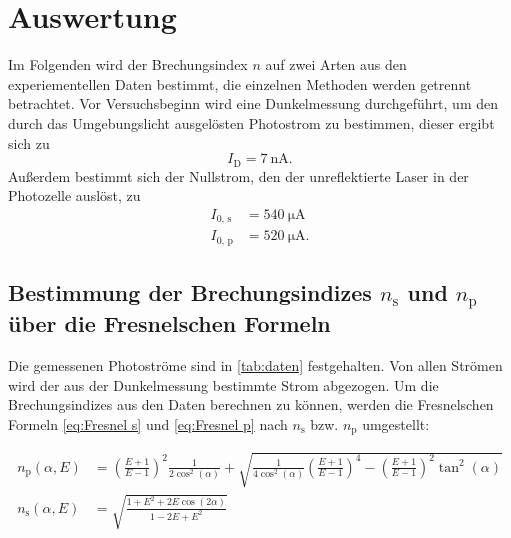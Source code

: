 \section{Auswertung}
\label{sec:Auswertung}

Im Folgenden wird der Brechungsindex $n$ auf zwei Arten aus den experiementellen Daten bestimmt,
die einzelnen Methoden werden getrennt betrachtet.
Vor Versuchsbeginn wird eine Dunkelmessung durchgeführt, um den durch das Umgebungslicht ausgelösten Photostrom
zu bestimmen, dieser ergibt sich zu
\begin{equation*}
    I_{\text{D}}=\qty{7}{\nano\ampere}.
\end{equation*}
Außerdem bestimmt sich der Nullstrom, den der unreflektierte Laser in der Photozelle auslöst, zu
\begin{align*}
    I_{\text{0, s}}&=\qty{540}{\micro\ampere} \\
    I_{\text{0, p}}&=\qty{520}{\micro\ampere}.
\end{align*}

\subsection{Bestimmung der Brechungsindizes $n_{\text{s}}$ und $n_{\text{p}}$ über die Fresnelschen Formeln}
\label{sec:fresnel}

Die gemessenen Photoströme sind in \autoref{tab:daten} festgehalten.
Von allen Strömen wird der aus der Dunkelmessung bestimmte Strom abgezogen.
Um die Brechungsindizes aus den Daten berechnen zu können, werden die Fresnelschen Formeln
\eqref{eq:Fresnel s} und \eqref{eq:Fresnel p} nach $n_{\text{s}}$ bzw. $n_{\text{p}}$ umgestellt:

\begin{align}
    n_\text{p}(\alpha, E) &= \left(\frac{E + 1}{E - 1}\right)^2 \frac{1}{2\cos^2(\alpha)} + \sqrt{\frac{1}{4\cos^2(\alpha)}\left(\frac{E + 1}{E - 1}\right)^4 - \left(\frac{E + 1}{E - 1}\right)^2\tan^2(\alpha)} \label{eq:n_s} \\
    n_\text{s}(\alpha, E) &= \sqrt{\frac{1 + E^2 + 2E\cos(2\alpha)}{1 - 2E + E^2}} \label{eq:n_p}
\end{align}

